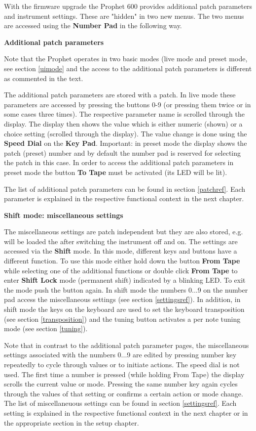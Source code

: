 \documentclass[draft,landscape, 11pt, oneside]{report}
\newenvironment{flowtext}{\addmargin[0cm]{7cm}}{\endaddmargin} %
\begin{document}
\begin{flowtext}
With the firmware upgrade the Prophet 600 provides additional patch parameters and instrument settings. These are "hidden" in two new menus. The two menus are accessed using the \textbf{Number Pad} in the following way. 

\textbf{Additional patch parameters}

Note that the Prophet operates in two basic modes (live mode and preset mode, see section \ref{uimode} and the access to the additional patch parameters is different as commented in the text.

The additional patch parameters are stored with a patch. In live mode these parameters are accessed by pressing the buttons 0-9 (or pressing them twice or in some cases three times). The respective parameter name is scrolled through the display. The display then shows the value which is either numeric (shown) or a choice setting (scrolled through the display). The value change is done using the \textbf{Speed Dial} on the \textbf{Key Pad}. Important: in preset mode the display shows the patch (preset) number and by default the number pad is reserved for selecting the patch in this case. In order to access the additional patch parameters in preset mode the button \textbf{To Tape} must be activated (its LED will be lit).
       
The list of additional patch parameters can be found in section \ref{patchref}. Each parameter is explained in the respective functional context in the next chapter.

\textbf{Shift mode: miscellaneous settings}

The miscellaneous settings are patch independent but they are also stored, e.g. will be loaded the after switching the instrument off and on. The settings are accessed via the \textbf{Shift} mode. In this mode, different keys and buttons have a different function. To use this mode either hold down the button \textbf{From Tape} while selecting one of the additional functions or double click \textbf{From Tape} to enter \textbf{Shift Lock} mode (permanent shift) indicated by a blinking LED. To exit the mode push the button again. In shift mode the numbers 0...9 on the number pad access the miscellaneous settings (see section \ref{settingsref}). In addition, in shift mode the keys on the keyboard are used to set the keyboard transposition (see section \ref{transposition}) and the tuning button activates a per note tuning mode (see section \ref{tuning}).

Note that in contrast to the additional patch parameter pages, the miscellaneous settings associated with the numbers 0...9 are edited by pressing number key repeatedly to cycle through values or to initiate actions. The speed dial is not used. The first time a number is pressed (while holding From Tape) the display scrolls the current value or mode. Pressing the same number key again cycles through the values of that setting or confirms a certain action or mode change. The list of miscellaneuous settings can be found in section \ref{settingsref}. Each setting is explained in the respective functional context in the next chapter or in the appropriate section in the setup chapter.


\end{flowtext}
\end{document}
